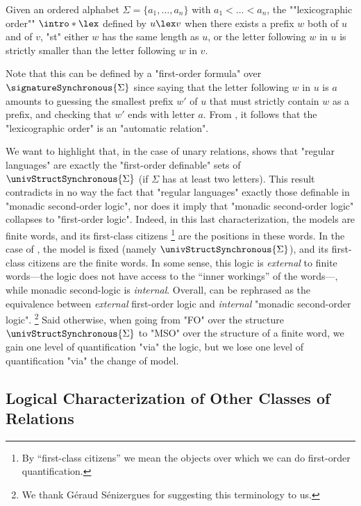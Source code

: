 \begin{example}
	\AP\label{ex:lexicographic-is-automatic}
	Given an ordered alphabet $\Sigma = \{a_1,\hdots,a_n\}$ with $a_1 < \hdots < a_n$,
	the \AP""lexicographic order"" $\intro*\lex$ defined by $u \lex v$ when there exists 
	a prefix $w$ both of $u$ and of $v$, "st" either $w$ has the same length as $u$,
	or the letter following $w$ in $u$ is strictly smaller than the letter following $w$ in $v$.
	
	Note that this can be defined by a "first-order formula" over $\signatureSynchronous{\Sigma}$
	since saying that the letter following $w$ in $u$ is $a$ amounts to
	guessing the smallest prefix $w'$ of $u$ that must strictly contain $w$ as a prefix,
	and checking that $w'$ ends with letter $a$.
	From , it follows that the "lexicographic order"
	is an "automatic relation".
\end{example}

We want to highlight that, in the case of unary relations,
 shows that "regular languages" are exactly
the "first-order definable" sets of $\univStructSynchronous{\Sigma}$
(if $\Sigma$ has at least two letters).
This result contradicts in no way the fact that "regular languages" exactly those definable
in "monadic second-order logic", nor does it imply that "monadic second-order logic"
collapses to "first-order logic". Indeed, in this last characterization,
the models are finite words, and its first-class citizens%
\footnote{By ``first-class citizens'' we mean the objects over which
we can do first-order quantification.} are the positions in these words.
In the case of , the model is fixed (namely $\univStructSynchronous{\Sigma}$), and its first-class citizens are the finite words.
In some sense, this logic is \emph{external} to finite words---the logic does not have access to the
``inner workings'' of the words---, while monadic second-logic is \emph{internal}.
Overall,  can be rephrased as the equivalence between
\emph{external} first-order logic and \emph{internal} "monadic second-order logic".%
\footnote{We thank Géraud Sénizergues for suggesting this terminology to us.}
Said otherwise, when going from "FO" over the structure $\univStructSynchronous{\Sigma}$ to "MSO" 
over the structure of a finite word, we gain one level of quantification "via" the logic,
but we lose one level of quantification "via" the change of model.
 

\subsection{Logical Characterization of Other Classes of Relations}

